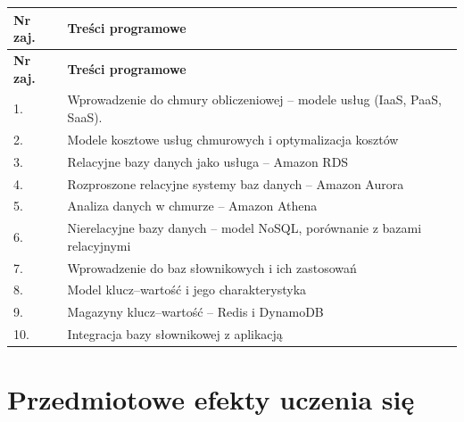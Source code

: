 \documentclass[12pt, a4paper]{article}
\newcommand{\thdrule}{\noalign{\global\setlength{\extrarowheight}{0pt}}}
\newcommand{\thdend}{\noalign{\global\setlength{\extrarowheight}{3pt}}}
\begin{document}
{\scriptsize
\begin{longtable}{m{1.5cm}m{14.5cm}}
\thdrule\toprule
\rowcolor{pjatkRed} {\color{white}\textbf{Nr zaj.}} & {\color{white}\textbf{Treści programowe}} \\
\midrule\thdend
\endfirsthead
\thdrule\toprule
\rowcolor{pjatkRed} {\color{white}\textbf{Nr zaj.}} & {\color{white}\textbf{Treści programowe}} \\
\midrule\thdend
\endhead
  \rowcolor{tableRowLight} 1. & Wprowadzenie do chmury obliczeniowej – modele usług (IaaS, PaaS, SaaS). \\
  \rowcolor{tableRowAlt} 2. & Modele kosztowe usług chmurowych i optymalizacja kosztów \\
  \rowcolor{tableRowLight} 3. & Relacyjne bazy danych jako usługa – Amazon RDS \\
  \rowcolor{tableRowAlt} 4. & Rozproszone relacyjne systemy baz danych – Amazon Aurora \\
  \rowcolor{tableRowLight} 5. & Analiza danych w chmurze – Amazon Athena \\
  \rowcolor{tableRowAlt} 6. & Nierelacyjne bazy danych – model NoSQL, porównanie z bazami relacyjnymi \\
  \rowcolor{tableRowLight} 7. & Wprowadzenie do baz słownikowych i ich zastosowań \\
  \rowcolor{tableRowAlt} 8. & Model klucz–wartość i jego charakterystyka \\
  \rowcolor{tableRowLight} 9. & Magazyny klucz–wartość – Redis i DynamoDB \\
  \rowcolor{tableRowAlt} 10. & Integracja bazy słownikowej z aplikacją \\
\bottomrule
\end{longtable}}

\section{Przedmiotowe efekty uczenia się}
\end{document}
